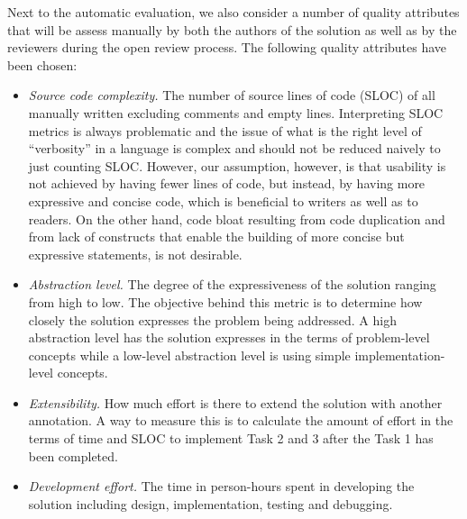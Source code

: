 Next to the automatic evaluation, we also consider a number of quality attributes that will be assess manually by both the authors of the solution as well as by the reviewers during the open review process.
The following quality attributes have been chosen:
%
\begin{itemize}[--]
  \item \emph{Source code complexity.} The number of source lines of code (SLOC) of all manually written excluding comments and empty lines.
  Interpreting SLOC metrics is always problematic and the issue of what is the right level of ``verbosity'' in a language is complex and should not be reduced naively to just counting SLOC.
  However, our assumption, however, is that usability is not achieved by having fewer lines of code, but instead, by having more expressive and concise code, which is beneficial to writers as well as to readers.
  On the other hand, code bloat resulting from code duplication and from lack of constructs that enable the building of more concise but expressive statements, is not desirable.

  \item \emph{Abstraction level.} The degree of the expressiveness of the solution ranging from high to low.
  The objective behind this metric is to determine how closely the solution expresses the problem being addressed.
  A high abstraction level has the solution expresses in the terms of problem-level concepts while a low-level abstraction level is using simple implementation-level concepts.

  \item \emph{Extensibility.} How much effort is there to extend the solution with another annotation.
  A way to measure this is to calculate the amount of effort in the terms of time and SLOC to implement Task 2 and 3 after the Task 1 has been completed.

  \item \emph{Development effort.} The time in person-hours spent in developing the solution including design, implementation, testing and debugging.
\end{itemize}
